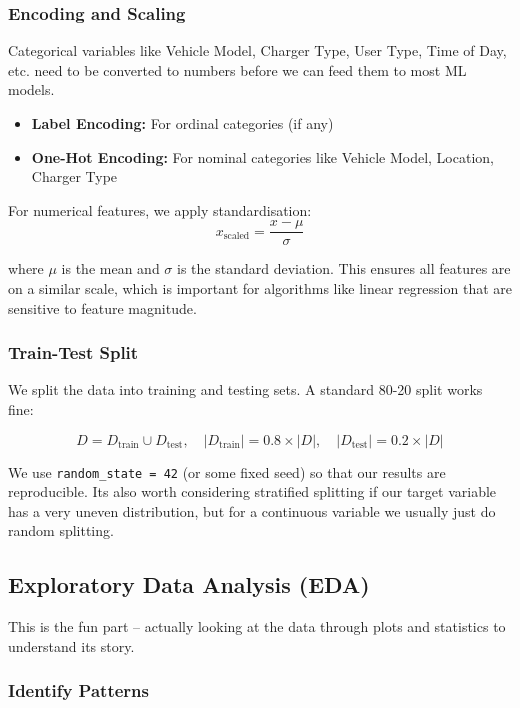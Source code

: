 \documentclass[12pt, a4paper]{article}
\begin{document}
\subsubsection{Encoding and Scaling}

Categorical variables like Vehicle Model, Charger Type, User Type, Time of Day, etc. need to be converted to numbers before we can feed them to most ML models.

\begin{itemize}
    \item \textbf{Label Encoding:} For ordinal categories (if any)
    \item \textbf{One-Hot Encoding:} For nominal categories like Vehicle Model, Location, Charger Type
\end{itemize}

For numerical features, we apply standardisation:
$$x_{\text{scaled}} = \frac{x - \mu}{\sigma}$$

where $\mu$ is the mean and $\sigma$ is the standard deviation. This ensures all features are on a similar scale, which is important for algorithms like linear regression that are sensitive to feature magnitude.

\subsubsection{Train-Test Split}

We split the data into training and testing sets. A standard 80-20 split works fine:

$$D = D_{\text{train}} \cup D_{\text{test}}, \quad |D_{\text{train}}| = 0.8 \times |D|, \quad |D_{\text{test}}| = 0.2 \times |D|$$

We use \texttt{random\_state = 42} (or some fixed seed) so that our results are reproducible. Its also worth considering stratified splitting if our target variable has a very uneven distribution, but for a continuous variable we usually just do random splitting.

\subsection{Exploratory Data Analysis (EDA)}

This is the fun part -- actually looking at the data through plots and statistics to understand its story.

\subsubsection{Identify Patterns}
\end{document}
